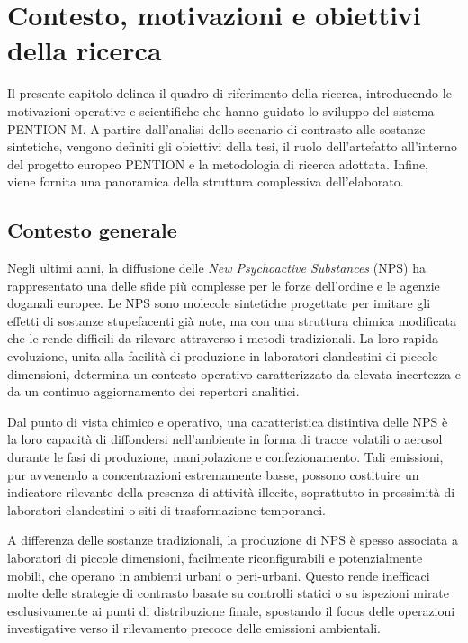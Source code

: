 
\chapter{Contesto, motivazioni e obiettivi della ricerca}

Il presente capitolo delinea il quadro di riferimento della ricerca, introducendo le motivazioni operative e scientifiche che hanno guidato lo sviluppo del sistema \textsc{PENTION-M}.
A partire dall'analisi dello scenario di contrasto alle sostanze sintetiche, vengono definiti gli obiettivi della tesi, il ruolo dell'artefatto all'interno del progetto europeo \textsc{PENTION} e la metodologia di ricerca adottata. Infine, viene fornita una panoramica della struttura complessiva dell'elaborato.

\section{Contesto generale}

Negli ultimi anni, la diffusione delle \textit{New Psychoactive Substances} (NPS) ha rappresentato una delle sfide più complesse per le forze dell’ordine e le agenzie doganali europee.
Le NPS sono molecole sintetiche progettate per imitare gli effetti di sostanze stupefacenti già note, ma con una struttura chimica modificata che le rende difficili da rilevare attraverso i metodi tradizionali. La loro rapida evoluzione, unita alla facilità di produzione in laboratori clandestini di piccole dimensioni, determina un contesto operativo caratterizzato da elevata incertezza e da un continuo aggiornamento dei repertori analitici.

Dal punto di vista chimico e operativo, una caratteristica distintiva delle NPS è la loro capacità di diffondersi nell’ambiente in forma di tracce volatili o aerosol durante le fasi di produzione, manipolazione e confezionamento.
Tali emissioni, pur avvenendo a concentrazioni estremamente basse, possono costituire un indicatore rilevante della presenza di attività illecite, soprattutto in prossimità di laboratori clandestini o siti di trasformazione temporanei.

A differenza delle sostanze tradizionali, la produzione di NPS è spesso associata a laboratori di piccole dimensioni, facilmente riconfigurabili e potenzialmente mobili, che operano in ambienti urbani o peri-urbani.
Questo rende inefficaci molte delle strategie di contrasto basate su controlli statici o su ispezioni mirate esclusivamente ai punti di distribuzione finale, spostando il focus delle operazioni investigative verso il rilevamento precoce delle emissioni ambientali.


